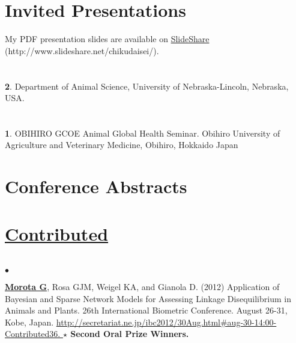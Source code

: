\documentclass[margin,line,10pt]{res}
\newenvironment{list1}{
  \begin{list}{\ding{113}}{%
      \setlength{\itemsep}{0in}
      \setlength{\parsep}{0in} \setlength{\parskip}{0in}
      \setlength{\topsep}{0in} \setlength{\partopsep}{0in} 
      \setlength{\leftmargin}{0.17in}}}{\end{list}}
\newenvironment{list2}{
  \begin{list}{$\bullet$}{%
      \setlength{\itemsep}{0in}
      \setlength{\parsep}{0in} \setlength{\parskip}{0in}
      \setlength{\topsep}{0in} \setlength{\partopsep}{0in} 
      \setlength{\leftmargin}{0.2in}}}{\end{list}}
\begin{document}
\begin{resume}
\section{\sc Invited Presentations}
My PDF presentation slides are available on \textcolor{blue}{\href{http://www.slideshare.net/chikudaisei/}{SlideShare}} (http://www.slideshare.net/chikudaisei/). \\



\section{}
\begin{list1}
\item [{\bf 2}.] Department of Animal Science, University of Nebraska-Lincoln, Nebraska, USA. 
\end{list1}

\section{}
\begin{list1}
\item [{\bf 1}.]  OBIHIRO GCOE Animal Global Health Seminar.  Obihiro University of Agriculture and  Veterinary Medicine, Obihiro, Hokkaido Japan   
\end{list1}  




\section{\sc Conference Abstracts}
\vspace{0.9cm}
\section{ \underline{\textnormal{Contributed}} }
\section{}
\begin{list2}
\item  {\bf \underline{Morota G}}, Rosa GJM, Weigel KA, and Gianola D. (2012)  
     Application of Bayesian and Sparse Network Models for Assessing Linkage Disequilibrium 
     in Animals and Plants. 26th International Biometric Conference. August 26-31, Kobe, Japan.  
     \textcolor{blue}{\href{http://secretariat.ne.jp/ibc2012/30Aug.html\#aug-30-14:00-Contributed36}{http://secretariat.ne.jp/ibc2012/30Aug.html\#aug-30-14:00-Contributed36. } }   {\bf $\star$ Second Oral Prize Winners.}
\end{list2}





\end{resume}
\end{document}
